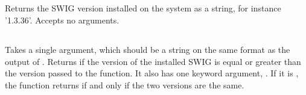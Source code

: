 \subsection[get\_swig\_version]{}
Returns the SWIG version installed on the system as a string, for instance
'1.3.36'. Accepts no arguments.

\subsection[check\_swig\_version]{}
Takes a single argument, which should be a string on the same format as the
output of . Returns  if the version of the
installed SWIG is equal or greater than the version passed to the function. It
also has one keyword argument, . If it is , the function
returns  if and only if the two versions are the same.
